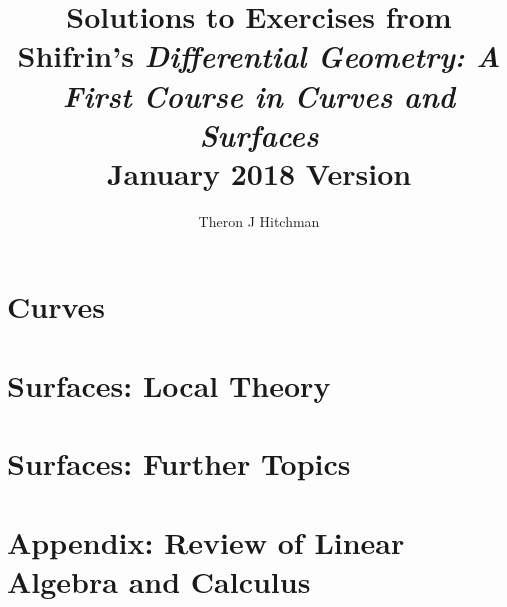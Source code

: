 \documentclass[11pt]{amsbook}
\title{Solutions to Exercises from \\
Shifrin's \emph{Differential Geometry: A First Course in Curves and Surfaces}\\
January 2018 Version}
\author{Theron J Hitchman}
\theoremstyle{plain}
\begin{document}
\maketitle

\tableofcontents



\chapter{Curves}

\pagebreak


\pagebreak


\pagebreak


\chapter{Surfaces: Local Theory}


\pagebreak


\pagebreak


\pagebreak


\pagebreak

\chapter{Surfaces: Further Topics}


\pagebreak


\pagebreak


\pagebreak


\pagebreak

\chapter{Appendix: Review of Linear Algebra and Calculus}







\end{document}
